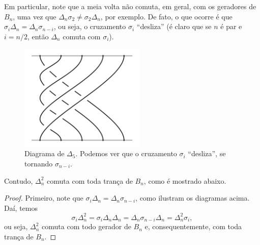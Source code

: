 	\par\vspace{0.3cm} Em particular, note que a meia volta não comuta, em geral, com os geradores 
	de $B_n$, uma vez que $\Delta_n\sigma_2\neq\sigma_2\Delta_n$, por exemplo. De fato, o que 
	ocorre é que $\sigma_i\Delta_n = \Delta_n\sigma_{n-i}$, ou seja, o cruzamento $\sigma_i$ 
	``desliza'' (é claro que se $n$ é par e $i=n/2$, então $\Delta_n$ comuta com $\sigma_i$).
	\begin{figure}[H]
		\label{delta5}
		\begin{center}	
			\includegraphics[width=6cm]{Images/delta5.png}
		\end{center}\caption{Diagrama de $\Delta_5$. Podemos ver que o cruzamento $\sigma_{i}$ ``desliza'', se tornando $\sigma_{n-i}$.}
	\end{figure}
	Contudo, $\Delta_n^2$ comuta com toda trança de $B_n$, como é mostrado abaixo.
	\begin{proof}
		Primeiro, note que $\sigma_i\Delta_n = \Delta_n\sigma_{n-i}$, como ilustram os diagramas acima. 
		Daí, temos
		\begin{equation*}
		    \sigma_i\Delta_n^2 = \sigma_i\Delta_n\Delta_n = \Delta_n\sigma_{n-i}\Delta_n = \Delta_n^2\sigma_i,
		\end{equation*}
		ou seja, $\Delta_n^2$ comuta com todo gerador de $B_n$ e, consequentemente, com toda trança de $B_n$.
	\end{proof}
